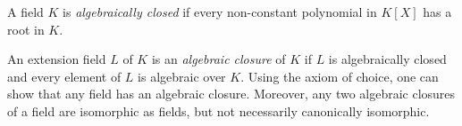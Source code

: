 \documentclass[12pt]{article}
\begin{document}
A field $K$ is \emph{algebraically closed} if every non-constant polynomial in $K[X]$ has a root in $K$.

An extension field $L$ of $K$ is an \emph{algebraic closure} of $K$ if $L$ is algebraically closed and every element of $L$ is algebraic over $K$.  Using the axiom of choice, one can show that any field has an algebraic closure.  Moreover, any two algebraic closures of a field are isomorphic as fields, but not necessarily canonically isomorphic.

\end{document}
